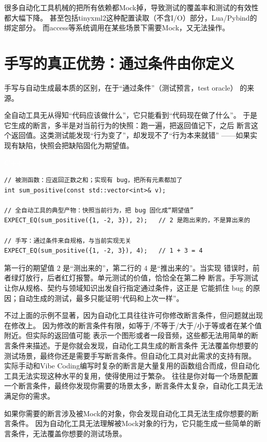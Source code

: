 \documentclass[12pt,a4paper,fontset=fandol]{ctexbook}
\newcommand{\cpplabel}{%
  \begin{tcolorbox}[enhanced,colback=cppheadbg,colframe=cppheadbg,
    arc=1mm,boxrule=0mm,left=6pt,right=6pt,top=2pt,bottom=2pt,
    halign=left,oversize]
    \textcolor{white}{\small\bfseries C++}
  \end{tcolorbox}\vspace{-4pt}}
\begin{document}
很多自动化工具机械的把所有依赖都Mock掉，导致测试的覆盖率和测试的有效性都大幅下降。
甚至包括tinyxml2这种配置读取（不含I/O）部分，Lua/Pybind的绑定部分。
而access等系统调用在某些场景下需要Mock，又无法操作。

\section{手写的真正优势：通过条件由你定义}

手写与自动生成最本质的区别，在于“通过条件”（测试预言，test oracle）
的来源。

全自动工具无从得知“代码应该做什么”，它只能看到“代码现在做了什么”。
于是它生成的断言，多半是对当前行为的快照：跑一遍，把返回值记下，之后
断言这个返回值。这类测试能发现“行为变了”，却发现不了“行为本来就错”
——如果实现有缺陷，快照会把缺陷固化为期望值。

\cpplabel
\begin{lstlisting}
// 被测函数：应返回正数之和；实现有 bug，把所有元素都加了
int sum_positive(const std::vector<int>& v);

// 全自动工具的典型产物：快照当前行为，把 bug 固化成“期望值”
EXPECT_EQ(sum_positive({1, -2, 3}), 2);   // 2 是跑出来的，不是算出来的

// 手写：通过条件来自规格，与当前实现无关
EXPECT_EQ(sum_positive({1, -2, 3}), 4);   // 1 + 3 = 4
\end{lstlisting}

第一行的期望值 $2$ 是“测出来的”，第二行的 $4$ 是“推出来的”。当实现
错误时，前者绿灯放行，后者红灯报警。单元测试的价值，恰恰全在第二种
断言。手写测试让你从规格、契约与领域知识出发自行指定通过条件，这正是
它能抓住 bug 的原因；自动生成的测试，最多只能证明“代码和上次一样”。

不过上面的示例不显著，因为自动化工具往往许可你修改断言条件，但问题就出现在修改上。
因为修改的断言条件有限，如等于/不等于/大于/小于等或者在某个值附近。但实际的返回值可能
表示一个图形或者一段音频，这些都无法用简单的断言条件来描述。于是你就会发现，自动化工具生成的断言条件
无法覆盖你想要的测试场景，最终你还是需要手写断言条件。但自动化工具对此需求的支持有限。
实际手动和Vibe Coding编写时复杂的断言是大量复用的函数组合而成，但自动化工具无法实现这种水平的复用，使得使用过于繁杂。
往往是你对每一个场景配置一个断言条件，最终你发现你需要的场景太多，断言条件太复杂，自动化工具无法满足你的需求。

如果你需要的断言涉及被Mock的对象，你会发现自动化工具无法生成你想要的断言条件。
因为自动化工具无法理解被Mock对象的行为，它只能生成一些简单的断言条件，无法覆盖你想要的测试场景。
\end{document}
